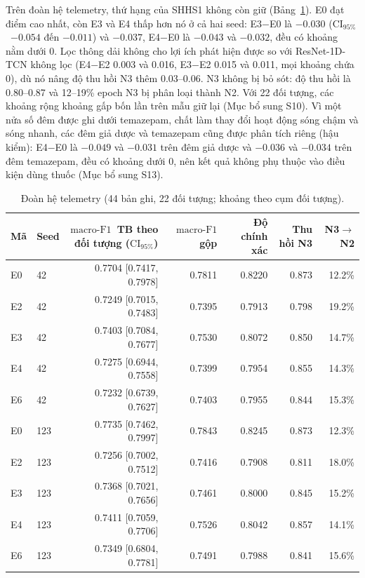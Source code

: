 \documentclass[11pt,a4paper]{article}
\newcommand{\mf}{\ensuremath{\mathrm{macro\text{-}F1}}}
\newcommand{\ci}{\ensuremath{\mathrm{CI}_{95\%}}}
\begin{document}
Trên đoàn hệ telemetry, thứ hạng của SHHS1 không còn giữ (Bảng~\ref{tab:telemetry}). E0 đạt điểm cao nhất, còn
E3 và E4 thấp hơn nó ở cả hai seed: E3$-$E0 là $-0.030$ (\ci\ $-0.054$ đến $-0.011$) và $-0.037$, E4$-$E0 là
$-0.043$ và $-0.032$, đều có khoảng nằm dưới 0. Lọc thông dải không cho lợi ích phát hiện được so với
ResNet-1D-TCN không lọc (E4$-$E2 0.003 và 0.016, E3$-$E2 0.015 và 0.011, mọi khoảng chứa 0), dù nó nâng độ thu
hồi N3 thêm 0.03--0.06. N3 không bị bỏ sót: độ thu hồi là 0.80--0.87 và 12--19\% epoch N3 bị phân loại thành N2.
Với 22 đối tượng, các khoảng rộng khoảng gấp bốn lần trên mẫu giữ lại (Mục bổ sung S10). Vì một nửa số đêm được
ghi dưới temazepam, chất làm thay đổi hoạt động sóng chậm và sóng nhanh, các đêm giả dược và temazepam cũng được
phân tích riêng (hậu kiểm): E4$-$E0 là $-0.049$ và $-0.031$ trên đêm giả dược và $-0.036$ và $-0.034$ trên đêm
temazepam, đều có khoảng dưới 0, nên kết quả không phụ thuộc vào điều kiện dùng thuốc (Mục bổ sung S13).

\begin{table}[H]
\centering
\caption{Đoàn hệ telemetry (44 bản ghi, 22 đối tượng; khoảng theo cụm đối tượng).}
\label{tab:telemetry}
\small
\begin{tabular}{llrrrrr}
\toprule
\textbf{Mã} & \textbf{Seed} & \textbf{\mf\ TB theo đối tượng (\ci)} & \textbf{\mf\ gộp} & \textbf{Độ chính xác} & \textbf{Thu hồi N3} & \textbf{N3$\to$N2} \\
\midrule
E0 & 42  & 0.7704 [0.7417, 0.7978] & 0.7811 & 0.8220 & 0.873 & 12.2\% \\
E2 & 42  & 0.7249 [0.7015, 0.7483] & 0.7395 & 0.7913 & 0.798 & 19.2\% \\
E3 & 42  & 0.7403 [0.7084, 0.7677] & 0.7530 & 0.8072 & 0.850 & 14.7\% \\
E4 & 42  & 0.7275 [0.6944, 0.7558] & 0.7399 & 0.7954 & 0.855 & 14.3\% \\
E6 & 42  & 0.7232 [0.6739, 0.7627] & 0.7403 & 0.7955 & 0.844 & 15.3\% \\
\addlinespace
E0 & 123 & 0.7735 [0.7462, 0.7997] & 0.7843 & 0.8245 & 0.873 & 12.3\% \\
E2 & 123 & 0.7256 [0.7002, 0.7512] & 0.7416 & 0.7908 & 0.811 & 18.0\% \\
E3 & 123 & 0.7368 [0.7021, 0.7656] & 0.7461 & 0.8000 & 0.845 & 15.2\% \\
E4 & 123 & 0.7411 [0.7059, 0.7706] & 0.7526 & 0.8042 & 0.857 & 14.1\% \\
E6 & 123 & 0.7349 [0.6804, 0.7781] & 0.7491 & 0.7988 & 0.841 & 15.6\% \\
\bottomrule
\end{tabular}
\end{table}
\end{document}
